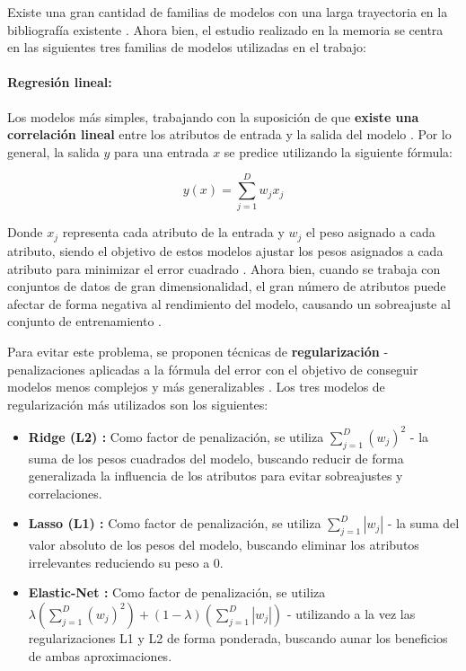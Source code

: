 Existe una gran cantidad de familias de modelos con una larga trayectoria en la bibliografía existente \cite{Burkov2019TheHM}. Ahora bien, el estudio realizado en la memoria se centra en las siguientes tres familias de modelos utilizadas en el trabajo:

\paragraph{Regresión lineal:}

Los modelos más simples, trabajando con la suposición de que \textbf{existe una correlación lineal} entre los atributos de entrada y la salida del modelo \cite{mlprobabilistic}. Por lo general, la salida $y$ para una entrada $x$ se predice utilizando la siguiente fórmula: 

$$y(x) = \sum_{j=1}^{D}w_j x_j$$

Donde $x_j$ representa cada atributo de la entrada y $w_j$ el peso asignado a cada atributo, siendo el objetivo de estos modelos ajustar los pesos asignados a cada atributo para minimizar el error cuadrado \cite{aima}. Ahora bien, cuando se trabaja con conjuntos de datos de gran dimensionalidad, el gran número de atributos puede afectar de forma negativa al rendimiento del modelo, causando un sobreajuste al conjunto de entrenamiento \cite{l1l2}.

Para evitar este problema, se proponen técnicas de \textbf{regularización} - penalizaciones aplicadas a la fórmula del error con el objetivo de conseguir modelos menos complejos y más generalizables \cite{elasticnet}. Los tres modelos de regularización más utilizados son los siguientes:

\begin{itemize}
	\item \textbf{Ridge (L2) \cite{ridge}:} Como factor de penalización, se utiliza $\sum_{j=1}^D(w_j)^2$ - la suma de los pesos cuadrados del modelo, buscando reducir de forma generalizada la influencia de los atributos para evitar sobreajustes y correlaciones.
	\item \textbf{Lasso (L1) \cite{lasso}:} Como factor de penalización, se utiliza $\sum_{j=1}^D|w_j|$ - la suma del valor absoluto de los pesos del modelo, buscando eliminar los atributos irrelevantes reduciendo su peso a $0$.
	\item \textbf{Elastic-Net \cite{elasticnet}:} Como factor de penalización, se utiliza $\lambda\left(\sum_{j=1}^D(w_j)^2\right) + (1-\lambda)\left(\sum_{j=1}^D|w_j|\right)$ - utilizando a la vez las regularizaciones L1 y L2 de forma ponderada, buscando aunar los beneficios de ambas aproximaciones.
\end{itemize}

